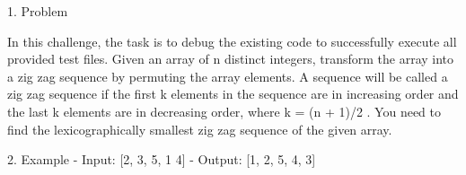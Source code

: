 1. Problem

In this challenge, the task is to debug the existing code to successfully execute all provided test files.
Given an array of n distinct integers, transform the array into a zig zag sequence by permuting the array elements. 
A sequence will be called a zig zag sequence if the first k elements in the sequence are in increasing order and the
last k elements are in decreasing order, where k = (n +  1)/2 . You need to find the lexicographically smallest zig zag sequence of the given array.

2. Example
- Input: [2, 3, 5, 1 4]
- Output: [1, 2, 5, 4, 3]
